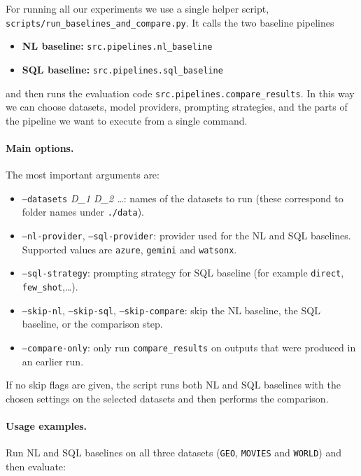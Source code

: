 \documentclass[12pt]{article}
\begin{document}
For running all our experiments we use a single helper script,
\texttt{scripts/run\_baselines\_and\_compare.py}. It calls the two baseline
pipelines

\begin{itemize}
    \item \textbf{NL baseline:} \texttt{src.pipelines.nl\_baseline}
    \item \textbf{SQL baseline:} \texttt{src.pipelines.sql\_baseline}
\end{itemize}

and then runs the evaluation code \texttt{src.pipelines.compare\_results}. In
this way we can choose datasets, model providers, prompting strategies, and the
parts of the pipeline we want to execute from a single command.

\paragraph{Main options.}
The most important arguments are:
\begin{itemize}
    \item \texttt{--datasets} \textit{D\_1 D\_2 \dots}: names of the datasets
    to run (these correspond to folder names under \texttt{./data}).
    \item \texttt{--nl-provider}, \texttt{--sql-provider}: provider used for
    the NL and SQL baselines. Supported values are \texttt{azure},
    \texttt{gemini} and \texttt{watsonx}.
    \item \texttt{--sql-strategy}: prompting strategy
    for SQL baseline (for example \texttt{direct}, \texttt{few\_shot},\dots).
    \item \texttt{--skip-nl}, \texttt{--skip-sql}, \texttt{--skip-compare}:
    skip the NL baseline, the SQL baseline, or the comparison step.
    \item \texttt{--compare-only}: only run \texttt{compare\_results} on
    outputs that were produced in an earlier run.
\end{itemize}

If no skip flags are given, the script runs both NL and SQL baselines with the
chosen settings on the selected datasets and then performs the comparison.

\paragraph{Usage examples.}

Run NL and SQL baselines on all three datasets (\texttt{GEO},
\texttt{MOVIES} and \texttt{WORLD}) and then evaluate:
\end{document}
